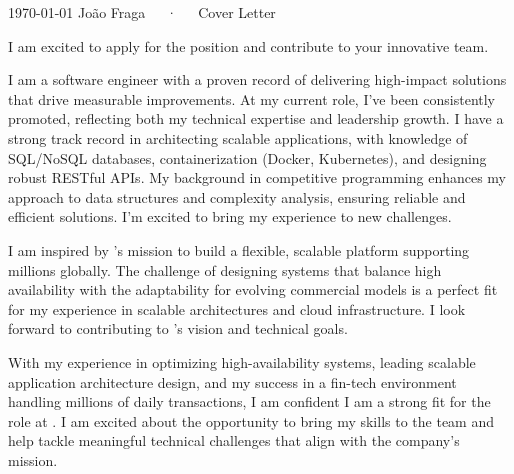 \documentclass[11pt, a4paper]{cv}
\begin{document}
\makecvheader[R]

\makecvfooter
  {\today}
  {João Fraga~~~·~~~Cover Letter}
  {}

\makelettertitle

\begin{cvletter}

I am excited to apply for the \makerole{} position and contribute to your innovative team.


I am a software engineer with a proven record of delivering high-impact solutions that drive measurable improvements.
At my current role, I’ve been consistently promoted, reflecting both my technical expertise and leadership growth.
I have a strong track record in architecting scalable applications, with knowledge of SQL/NoSQL databases, containerization (Docker, Kubernetes), and designing robust RESTful APIs.
My background in competitive programming enhances my approach to data structures and complexity analysis, ensuring reliable and efficient solutions.
I’m excited to bring my experience to new challenges.


I am inspired by \makecompany{}’s mission to build a flexible, scalable platform supporting millions globally.
The challenge of designing systems that balance high availability with the adaptability for evolving commercial models is a perfect fit for my experience in scalable architectures and cloud infrastructure.
I look forward to contributing to \makecompany{}'s vision and technical goals.


With my experience in optimizing high-availability systems, leading scalable application architecture design, and my success in a fin-tech environment handling millions of daily transactions, I am confident I am a strong fit for the \makerole{} role at \makecompany{}.
I am excited about the opportunity to bring my skills to the team and help tackle meaningful technical challenges that align
with the company’s mission.

\end{cvletter}

\makeletterclosing
\end{document}
